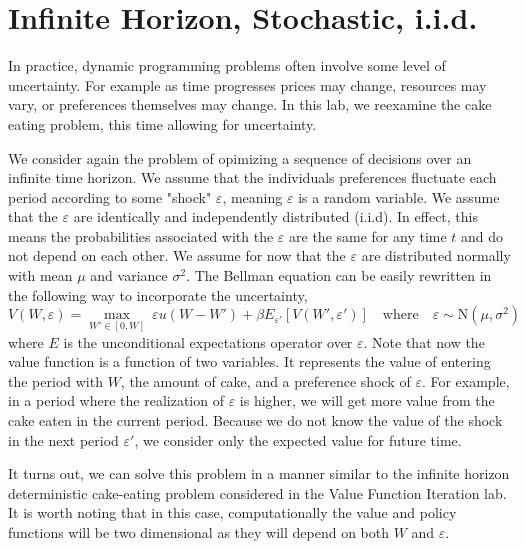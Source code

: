 \newcommand\ve{\varepsilon}


\section*{Infinite Horizon, Stochastic, i.i.d.}\label{SecRecProbInfinHorStochiid}

In practice, dynamic programming problems often involve some level of uncertainty.  For example as time progresses prices may change, resources may vary, or preferences themselves may change.  In this lab, we reexamine the cake eating problem, this time allowing for uncertainty.

We consider again the problem of opimizing a sequence of decisions over an infinite time horizon.  We assume that the individuals preferences fluctuate each period according to some "shock" $\ve$, meaning $\ve$ is a random variable.  We assume that the $\ve$ are identically and independently distributed (i.i.d).  In effect, this means the probabilities associated with the $\ve$ are the same for any time $t$ and do not depend on each other.  We assume for now that the $\ve$ are distributed normally with mean $\mu$ and variance $\sigma^2$.  The Bellman equation can be easily rewritten in the following way to incorporate the uncertainty,
\begin{equation*}\label{stoch_Bellman}
   V\left(W,\ve\right) = \max_{W'\in[0,W]}\: \ve u\left(W - W'\right) + \beta E_{\ve'}\left[V\left(W',\ve'\right)\right] \quad\text{where}\quad \ve \sim \text{N}(\mu,\sigma^2)
\end{equation*}
where $E$ is the unconditional expectations operator over $\ve$.  Note that now the value function is a function of two variables.  It represents the value of entering the period with $W$, the amount of cake, and a preference shock of $\ve$.  For example, in a period where the realization of $\ve$ is higher, we will get more value from the cake eaten in the current period.  Because we do not know the value of the shock in the next period $\ve'$, we consider only the expected value for future time.

It turns out, we can solve this problem in a manner similar to the infinite horizon deterministic cake-eating problem considered in the Value Function Iteration lab.  It is worth noting that in this case, computationally the value and policy functions will be two dimensional as they will depend on both $W$ and $\ve$.

